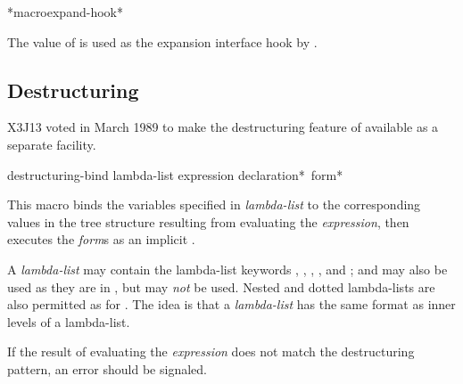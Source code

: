 \begin{defun}[Variable]
*macroexpand-hook*

The value of  is used as the expansion
interface hook by .
\end{defun}

\begin{newer}
\section{Destructuring}

X3J13 voted in March 1989 
to make the destructuring feature of 
available as a separate facility.

\begin{defmac}
destructuring-bind lambda-list expression {declaration}* {\,form}*

   This macro binds the variables specified in \emph{lambda-list} to the corresponding
   values in the tree structure resulting from evaluating the \emph{expression},
   then executes the \emph{form\/}s as an implicit .

A  \emph{lambda-list} may contain
the lambda-list keywords , , ,
, and ;  and 
may also be used as they are in , but  may
\emph{not} be used.  Nested and dotted lambda-lists are also permitted
as for .
The idea is that a  \emph{lambda-list}
has the same format as inner levels of a  lambda-list.

   If the result of evaluating the \emph{expression} does not match the 
   destructuring pattern, an error should be signaled.
\end{defmac}
\end{newer}


